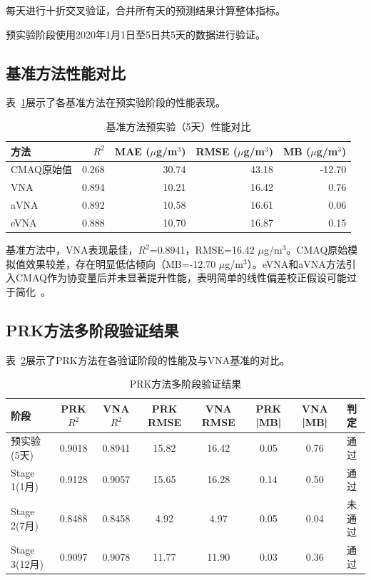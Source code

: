 \documentclass[UTF8, a4paper, 12pt]{article}
\begin{document}
每天进行十折交叉验证，合并所有天的预测结果计算整体指标。

预实验阶段使用2020年1月1日至5日共5天的数据进行验证。

\subsection{基准方法性能对比}

表~\ref{tab:benchmark}展示了各基准方法在预实验阶段的性能表现。

\begin{table}[htbp]
\centering
\caption{基准方法预实验（5天）性能对比}
\label{tab:benchmark}
\begin{tabular}{@{}lrrrr@{}}
\toprule
方法 & $R^2$ & MAE ($\mu$g/m$^3$) & RMSE ($\mu$g/m$^3$) & MB ($\mu$g/m$^3$) \\
\midrule
CMAQ原始值 & 0.268 & 30.74 & 43.18 & -12.70 \\
VNA & 0.894 & 10.21 & 16.42 & 0.76 \\
aVNA & 0.892 & 10.58 & 16.61 & 0.06 \\
eVNA & 0.888 & 10.70 & 16.87 & 0.15 \\
\bottomrule
\end{tabular}
\end{table}

基准方法中，VNA表现最佳，$R^2$=0.8941，RMSE=16.42 $\mu$g/m$^3$。CMAQ原始模拟值效果较差，存在明显低估倾向（MB=-12.70 $\mu$g/m$^3$）。eVNA和aVNA方法引入CMAQ作为协变量后并未显著提升性能，表明简单的线性偏差校正假设可能过于简化~\cite{liu2019spatial}。

\subsection{PRK方法多阶段验证结果}

表~\ref{tab:innovation}展示了PRK方法在各验证阶段的性能及与VNA基准的对比。

\begin{table}[htbp]
\centering
\caption{PRK方法多阶段验证结果}
\label{tab:innovation}
\begin{tabular}{@{}lccccccc@{}}
\toprule
阶段 & PRK $R^2$ & VNA $R^2$ & PRK RMSE & VNA RMSE & PRK |MB| & VNA |MB| & 判定 \\
\midrule
预实验(5天) & 0.9018 & 0.8941 & 15.82 & 16.42 & 0.05 & 0.76 & 通过 \\
Stage 1(1月) & 0.9128 & 0.9057 & 15.65 & 16.28 & 0.14 & 0.50 & 通过 \\
Stage 2(7月) & 0.8488 & 0.8458 & 4.92 & 4.97 & 0.05 & 0.04 & 未通过 \\
Stage 3(12月) & 0.9097 & 0.9078 & 11.77 & 11.90 & 0.03 & 0.36 & 通过 \\
\bottomrule
\end{tabular}
\end{table}
\end{document}
